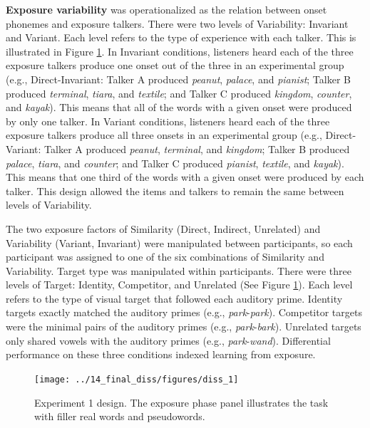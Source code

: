 \documentclass[preprint, 3p, authoryear]{elsarticle} %
\begin{document}
\textbf{Exposure variability} was operationalized as the relation between onset phonemes and exposure talkers.
There were two levels of Variability: Invariant and Variant.
Each level refers to the type of experience with each talker.
This is illustrated in Figure \ref{fig:exp1-fig}.
In Invariant conditions, listeners heard each of the three exposure talkers produce one onset out of the three in an experimental group (e.g., Direct-Invariant: Talker A produced \emph{peanut}, \emph{palace}, and \emph{pianist}; Talker B produced \emph{terminal}, \emph{tiara}, and \emph{textile}; and Talker C produced \emph{kingdom}, \emph{counter}, and \emph{kayak}).
This means that all of the words with a given onset were produced by only one talker.
In Variant conditions, listeners heard each of the three exposure talkers produce all three onsets in an experimental group (e.g., Direct-Variant: Talker A produced \emph{peanut}, \emph{terminal}, and \emph{kingdom}; Talker B produced \emph{palace}, \emph{tiara}, and \emph{counter}; and Talker C produced \emph{pianist}, \emph{textile}, and \emph{kayak}).
This means that one third of the words with a given onset were produced by each talker.
This design allowed the items and talkers to remain the same between levels of Variability.

The two exposure factors of Similarity (Direct, Indirect, Unrelated) and Variability (Variant, Invariant) were manipulated between participants, so each participant was assigned to one of the six combinations of Similarity and Variability.
Target type was manipulated within participants.
There were three levels of Target: Identity, Competitor, and Unrelated (See Figure \ref{fig:exp1-fig}).
Each level refers to the type of visual target that followed each auditory prime.
Identity targets exactly matched the auditory primes (e.g., \emph{park}-\emph{park}).
Competitor targets were the minimal pairs of the auditory primes (e.g., \emph{park}-\emph{bark}).
Unrelated targets only shared vowels with the auditory primes (e.g., \emph{park}-\emph{wand}).
Differential performance on these three conditions indexed learning from exposure.

\begin{figure}

{\centering \texttt{[image: ../14\_final\_diss/figures/diss\_1]} 

}

\caption{Experiment 1 design. The exposure phase panel illustrates the task with filler real words and pseudowords.}\label{fig:exp1-fig}
\end{figure}
\end{document}
